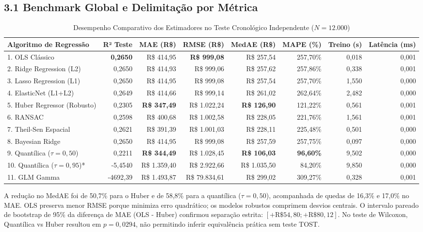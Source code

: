 \documentclass[10pt,a4paper,journal]{article}
\begin{document}
\subsection{3.1 Benchmark Global e Delimitação por Métrica}

\begin{table}[htbp]
\centering
\small
\caption{Desempenho Comparativo dos Estimadores no Teste Cronológico Independente ($N = 12.000$)}
\begin{tabular}{lrrrrrrr}
\toprule
Algoritmo de Regressão & R² Teste & MAE (R\$) & RMSE (R\$) & MedAE (R\$) & MAPE (\%) & Treino (s) & Latência (ms) \\
\midrule
1. OLS Clássico & \textbf{0,2650} & R\$ 414,95 & \textbf{R\$ 999,08} & R\$ 257,54 & 257,70\% & 0,018 & 0,001 \\
2. Ridge Regression (L2) & 0,2650 & R\$ 414,93 & R\$ 999,06 & R\$ 257,62 & 257,86\% & 0,338 & 0,001 \\
3. Lasso Regression (L1) & 0,2650 & R\$ 414,95 & R\$ 999,08 & R\$ 257,54 & 257,70\% & 1,550 & 0,000 \\
4. ElasticNet (L1+L2) & 0,2649 & R\$ 414,66 & R\$ 999,14 & R\$ 261,02 & 262,64\% & 2,482 & 0,000 \\
5. Huber Regressor (Robusto) & 0,2305 & \textbf{R\$ 347,49} & R\$ 1.022,24 & \textbf{R\$ 126,90} & 121,22\% & 0,561 & 0,001 \\
6. RANSAC & 0,2598 & R\$ 400,68 & R\$ 1.002,58 & R\$ 228,05 & 221,76\% & 1,561 & 0,001 \\
7. Theil-Sen Espacial & 0,2621 & R\$ 391,39 & R\$ 1.001,03 & R\$ 228,11 & 225,48\% & 0,501 & 0,000 \\
8. Bayesian Ridge & 0,2650 & R\$ 414,95 & R\$ 999,08 & R\$ 257,59 & 257,75\% & 0,097 & 0,000 \\
9. Quantílica ($\tau=0,50$) & 0,2211 & \textbf{R\$ 344,49} & R\$ 1.028,45 & \textbf{R\$ 106,03} & \textbf{96,60\%} & 9,502 & 0,000 \\
10. Quantílica ($\tau=0,95$)* & -5,4540 & R\$ 1.359,40 & R\$ 2.922,66 & R\$ 1.035,50 & 84,20\% & 9,850 & 0,000 \\
11. GLM Gamma & -4692,39 & R\$ 1.493,87 & R\$ 79.834,61 & R\$ 299,02 & 309,27\% & 0,328 & 0,001 \\
\bottomrule
\end{tabular}
\end{table}

A redução no MedAE foi de 50,7\% para o Huber e de 58,8\% para a quantílica ($\tau=0,50$), acompanhada de quedas de 16,3\% e 17,0\% no MAE. OLS preserva menor RMSE porque minimiza erro quadrático; os modelos robustos comprimem desvios centrais.
O intervalo pareado de bootstrap de 95\% da diferença de MAE (OLS - Huber) confirmou separação estrita: $[+\text{R\$ } 54,80 ; +\text{R\$ } 80,12]$. No teste de Wilcoxon, Quantílica vs Huber resultou em $p = 0,0294$, não permitindo inferir equivalência prática sem teste TOST.
\end{document}
